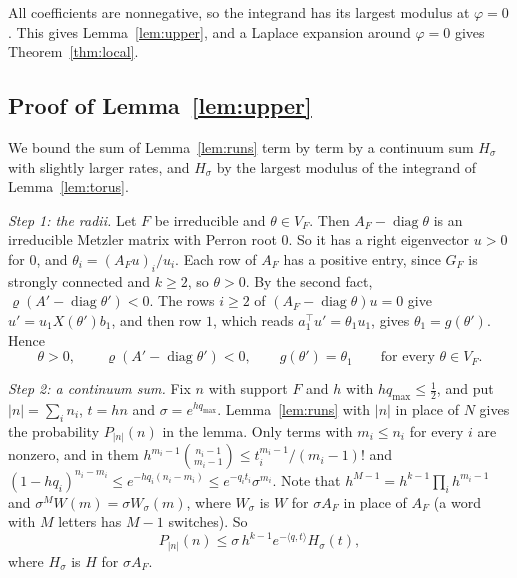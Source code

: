 All coefficients are nonnegative, so the integrand has its largest modulus
at $\varphi=0$. This gives Lemma~\ref{lem:upper}, and a Laplace expansion
around $\varphi=0$ gives Theorem~\ref{thm:local}.

\subsection{Proof of \texorpdfstring{Lemma~\ref{lem:upper}}{the upper bound}}

We bound the sum of Lemma~\ref{lem:runs} term by term by a continuum sum
$H_\sigma$ with slightly larger rates, and $H_\sigma$ by the largest modulus
of the integrand of Lemma~\ref{lem:torus}.

\emph{Step 1: the radii.} Let $F$ be irreducible and $\theta\in V_F$. Then
$A_F-\operatorname{diag}\theta$ is an irreducible Metzler matrix with Perron
root $0$. So it has a right eigenvector $u>0$ for $0$, and
$\theta_i=(A_Fu)_i/u_i$. Each row of $A_F$ has a positive entry, since $G_F$
is strongly connected and $k\ge2$, so $\theta>0$. By the second fact,
$\varrho(A'-\operatorname{diag}\theta')<0$. The rows $i\ge2$ of
$(A_F-\operatorname{diag}\theta)u=0$ give $u'=u_1X(\theta')b_1$, and then row
$1$, which reads $a_1^\top u'=\theta_1u_1$, gives $\theta_1=g(\theta')$. Hence
\begin{equation}\label{eq:A-radii}
\theta>0,\qquad \varrho(A'-\operatorname{diag}\theta')<0,\qquad
g(\theta')=\theta_1\qquad\text{for every }\theta\in V_F .
\end{equation}

\emph{Step 2: a continuum sum.} Fix $n$ with support $F$ and $h$ with
$hq_{\max}\le\frac12$, and put $|n|=\sum_in_i$, $t=hn$ and
$\sigma=e^{hq_{\max}}$. Lemma~\ref{lem:runs} with $|n|$ in place of $N$ gives
the probability $P_{|n|}(n)$ in the lemma. Only terms with $m_i\le n_i$ for
every $i$ are nonzero, and in them
$h^{m_i-1}\binom{n_i-1}{m_i-1}\le t_i^{m_i-1}/(m_i-1)!$ and
$(1-hq_i)^{n_i-m_i}\le e^{-hq_i(n_i-m_i)}\le e^{-q_it_i}\sigma^{m_i}$. Note
that $h^{M-1}=h^{k-1}\prod_ih^{m_i-1}$ and
$\sigma^MW(m)=\sigma W_\sigma(m)$, where $W_\sigma$ is $W$ for $\sigma A_F$ in
place of $A_F$ (a word with $M$ letters has $M-1$ switches). So
\begin{equation}\label{eq:A-sigma}
P_{|n|}(n)\le\sigma\,h^{k-1}e^{-\langle q,t\rangle}H_\sigma(t),
\end{equation}
where $H_\sigma$ is $H$ for $\sigma A_F$.

